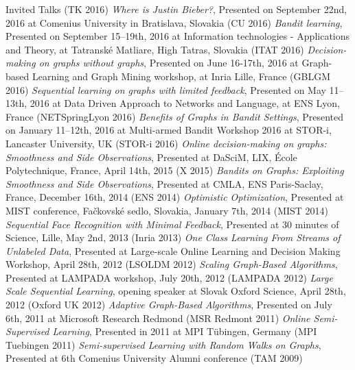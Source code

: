 \documentclass{resume}
\begin{document}
\begin{category}{Invited Talks}
({\sf TK 2016})
\citembullet
\emph{Where is Justin Bieber?}, Presented on September 22nd, 2016 at Comenius University in Bratislava, Slovakia 
({\sf CU 2016})
\citembullet
\emph{Bandit learning}, Presented on September 15--19th, 2016 at Information technologies - Applications and Theory, at Tatransk\' e Matliare, High Tatras, Slovakia
({\sf ITAT 2016})
\citembullet
\emph{Decision-making on graphs without graphs}, Presented on June 16-17th, 2016 at Graph-based Learning and Graph Mining workshop, at Inria Lille, France
({\sf GBLGM 2016})
\citembullet
\emph{Sequential learning on graphs with limited feedback}, Presented on May 11--13th, 2016 at Data Driven Approach to Networks and Language, at ENS Lyon, France
({\sf NETSpringLyon 2016})
\citembullet
\emph{Benefits of Graphs in Bandit Settings}, Presented on January 11--12th, 2016 at Multi-armed Bandit Workshop 2016 at STOR-i, Lancaster University, UK 
({\sf STOR-i 2016})
\citembullet
\emph{Online decision-making on graphs: Smoothness and Side Observations},
 Presented  at DaSciM, LIX, \'Ecole Polytechnique, France, April 14th, 2015 
({\sf X 2015})
\citembullet
\emph{Bandits on Graphs: Exploiting Smoothness and Side Observations},
 Presented  at CMLA, ENS Paris-Saclay, France, December 16th, 2014 
({\sf ENS 2014})
\citembullet
  \emph{Optimistic Optimization},
 Presented  at MIST conference, Fa\v ckovsk\' e sedlo, Slovakia, January 7th, 2014
({\sf MIST 2014})
\citembullet
\emph{Sequential Face Recognition with Minimal Feedback},
Presented at 30 minutes of Science, Lille, May 2nd, 2013 ({\sf Inria 2013})
\citembullet
 \emph{One Class Learning From Streams of Unlabeled Data},
Presented at Large-scale Online Learning and Decision Making Workshop,
April 28th, 2012 ({\sf LSOLDM 2012})
\citembullet
 \emph{Scaling Graph-Based Algorithms}, Presented at
LAMPADA workshop, July 20th, 2012 ({\sf LAMPADA 2012})
\citembullet
\emph{Large Scale Sequential Learning}, opening speaker at
Slovak Oxford Science, April 28th, 2012 ({\sf Oxford UK 2012})
\citembullet
 \emph{Adaptive Graph-Based Algorithms}, Presented on July
6th, 2011 at Microsoft Research Redmond ({\sf MSR Redmont 2011})
\citembullet
 \emph{Online Semi-Supervised Learning}, Presented in 2011
at MPI T\"{u}bingen, Germany ({\sf MPI Tuebingen 2011})
\citembullet
 \emph{Semi-supervised Learning with Random Walks on
Graphs}, Presented at 6th Comenius University Alumni conference ({\sf TAM 2009})
\end{category}
\end{document}
